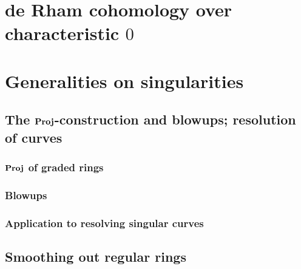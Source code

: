     \section{de Rham cohomology over characteristic \texorpdfstring{$0$}{}} \label{section: algebraic_de_rham_cohomology_over_characteristic_0}
    
    \section{Generalities on singularities}
        \subsection{The \texorpdfstring{$\mathbf{Proj}$}{}-construction and blowups; resolution of curves}
            \subsubsection{\texorpdfstring{$\mathbf{Proj}$}{} of graded rings}
            
            \subsubsection{Blowups}
            
            \subsubsection{Application to resolving singular curves}
        
        \subsection{Smoothing out regular rings}
